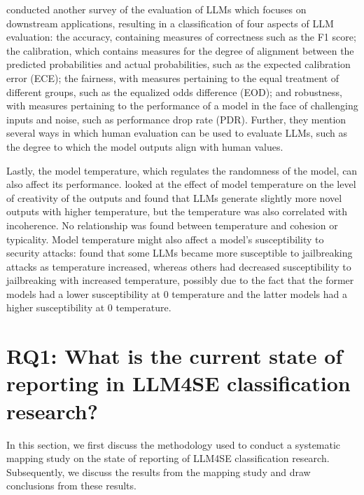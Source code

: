 \documentclass[a4paper]{article}
\begin{document}
\textcite{chang2023} conducted another survey of the evaluation of LLMs which focuses on downstream applications, resulting in a classification of four aspects of LLM evaluation: the accuracy, containing measures of correctness such as the F1 score; the calibration, which contains measures for the degree of alignment between the predicted probabilities and actual probabilities, such as the expected calibration error (ECE); the fairness, with measures pertaining to the equal treatment of different groups, such as the equalized odds difference (EOD); and robustness, with measures pertaining to the performance of a model in the face of challenging inputs and noise, such as performance drop rate (PDR). Further, they mention several ways in which human evaluation can be used to evaluate LLMs, such as the degree to which the model outputs align with human values.

Lastly, the model temperature, which regulates the randomness of the model, can also affect its performance. \textcite{peeperkorn2024} looked at the effect of model temperature on the level of creativity of the outputs and found that LLMs generate slightly more novel outputs with higher temperature, but the temperature was also correlated with incoherence. No relationship was found between temperature and cohesion or typicality. Model temperature might also affect a model's susceptibility to security attacks: \textcite{Yu2024} found that some LLMs became more susceptible to jailbreaking attacks as temperature increased, whereas others had decreased susceptibility to jailbreaking with increased temperature, possibly due to the fact that the former models had a lower susceptibility at 0 temperature and the latter models had a higher susceptibility at 0 temperature.


\section{RQ1: What is the current state of reporting in LLM4SE classification research?}
\label{RQ1}

In this section, we first discuss the methodology used to conduct a systematic mapping study on the state of reporting of LLM4SE classification research. Subsequently, we discuss the results from the mapping study and draw conclusions from these results.
\end{document}
